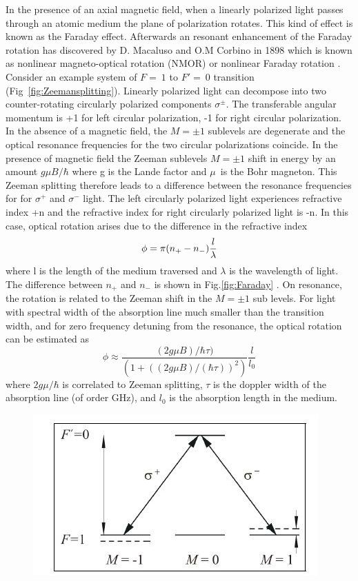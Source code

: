 \begin{itemize}
\begin{itemize}
 In the presence of an axial magnetic field, when a linearly polarized light passes through an atomic medium the plane of polarization rotates. This kind of effect is known as the Faraday effect. Afterwards an resonant enhancement of the Faraday rotation has discovered by D. Macaluso and O.M Corbino in 1898 which is known as nonlinear magneto-optical rotation (NMOR) or nonlinear Faraday rotation \cite{budker2013optical}. Consider an example system of $ F=~1$ to $F'=~0$ transition (Fig~\ref{fig:Zeemansplitting}).  Linearly polarized light can decompose into two counter-rotating circularly polarized components $\sigma^\pm$. The transferable angular momentum is +1 for left circular polarization, -1 for right circular polarization. In
the absence of a magnetic field, the $M=\pm 1$ sublevels are
degenerate and the optical resonance frequencies for  the two circular
polarizations coincide. 
 In the presence of magnetic field the Zeeman sublevels $M=\pm 1$ shift in energy  by an amount $g\mu B/\hbar$ where g is the Lande factor and $\mu$~is the Bohr magneton. This Zeeman splitting therefore leads to a difference between the  resonance frequencies for for $\sigma^+$ and
$\sigma^-$ light. The left circularly polarized light experiences refractive index +n and the refractive index for right circularly polarized light is -n. In this case, optical rotation arises due to the difference in the refractive index 
\begin{equation}
\label{eq:emc}
\phi = \pi(n_+-n_{-})\frac{l}{\lambda} \\
\end{equation}
where l is the length of the medium traversed and $\lambda$ is the wavelength of light. The difference between $n_+$ and $n_-$ is shown in  Fig.\ref{fig:Faraday} . On resonance, the rotation is related to the Zeeman shift in the $M=\pm 1$ sub levels. For light with spectral
width of the absorption line much smaller than the transition width, and for zero
frequency detuning from the resonance, the optical rotation can be estimated as
\begin{equation}
\phi \approx \frac{(2g\mu B)/ \hbar\tau)}{(1+((2g\mu B)/(\hbar\tau))^2 )}\frac{l}{l_0}
\end{equation}
where $2g\mu/\hbar$ is correlated to Zeeman splitting, $\tau$ is the doppler width of the
absorption line (of order GHz), and $l_0$ is the absorption length in the medium. 
\begin{figure}[h]
\centering
\includegraphics[width=0.75\linewidth]{figures/optical_rotation}

\end{figure}
\end{itemize}
\end{itemize}
